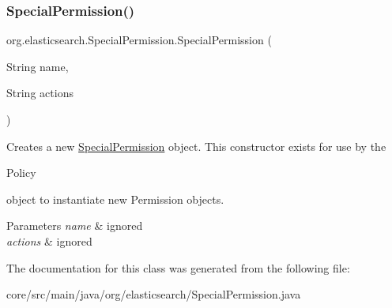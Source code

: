 \subsubsection{\texorpdfstring{Special\+Permission()}{SpecialPermission()}\hspace{0.1cm}{\footnotesize\ttfamily [2/2]}}
{\footnotesize\ttfamily org.\+elasticsearch.\+Special\+Permission.\+Special\+Permission (\begin{DoxyParamCaption}\item[{String}]{name,  }\item[{String}]{actions }\end{DoxyParamCaption})}

Creates a new \hyperlink{classorg_1_1elasticsearch_1_1_special_permission}{Special\+Permission} object. This constructor exists for use by the
\begin{DoxyCode}
Policy 
\end{DoxyCode}
 object to instantiate new Permission objects.


\begin{DoxyParams}{Parameters}
{\em name} & ignored \\
\hline
{\em actions} & ignored \\
\hline
\end{DoxyParams}


The documentation for this class was generated from the following file\+:\begin{DoxyCompactItemize}
\item 
core/src/main/java/org/elasticsearch/Special\+Permission.\+java\end{DoxyCompactItemize}

